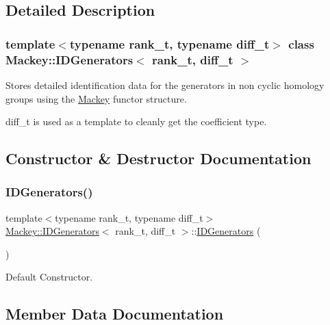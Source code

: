\subsection{Detailed Description}
\subsubsection*{template$<$typename rank\+\_\+t, typename diff\+\_\+t$>$\newline
class Mackey\+::\+I\+D\+Generators$<$ rank\+\_\+t, diff\+\_\+t $>$}

Stores detailed identification data for the generators in non cyclic homology groups using the \hyperlink{namespaceMackey}{Mackey} functor structure. 

diff\+\_\+t is used as a template to cleanly get the coefficient type. 

\subsection{Constructor \& Destructor Documentation}
\mbox{\label{classMackey_1_1IDGenerators_a2f7d0d382aca772c12e27a3c65510643}} 
\subsubsection{\texorpdfstring{I\+D\+Generators()}{IDGenerators()}}
{\footnotesize\ttfamily template$<$typename rank\+\_\+t, typename diff\+\_\+t$>$ \\
\hyperlink{classMackey_1_1IDGenerators}{Mackey\+::\+I\+D\+Generators}$<$ rank\+\_\+t, diff\+\_\+t $>$\+::\hyperlink{classMackey_1_1IDGenerators}{I\+D\+Generators} (\begin{DoxyParamCaption}{ }\end{DoxyParamCaption})\hspace{0.3cm}{\ttfamily [inline]}}



Default Constructor. 



\subsection{Member Data Documentation}
\mbox{\label{classMackey_1_1IDGenerators_ad9fd855102a6663a9d7b3c93dc9c369d}} 
